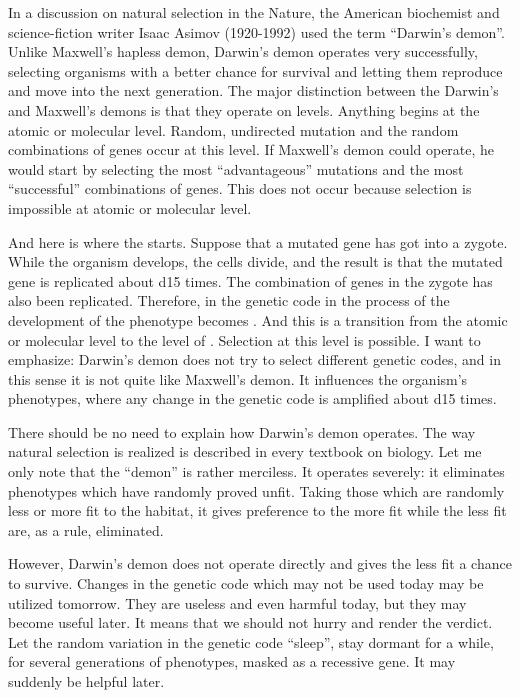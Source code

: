 In a discussion on natural selection in the Nature, the American biochemist and science-fiction writer Isaac Asimov (1920-1992) used the term ``Darwin's demon''. Unlike Maxwell's hapless demon, Darwin's demon operates very successfully, selecting organisms with a better
chance for survival and letting them reproduce and move into the next
generation. The major distinction between the Darwin's and Maxwell's
demons is that they operate on  levels. Anything begins at the atomic or molecular level. Random, undirected mutation and the
random combinations of genes occur at this level. If Maxwell's demon
could operate, he would start by selecting the most ``advantageous''
mutations and the most ``successful'' combinations of genes. This does not occur because selection is impossible at atomic or molecular level. 



And here is where the  starts. Suppose that a mutated gene has got into a zygote. While the organism develops, the cells divide, and the result is that the mutated gene is replicated about
\num{d15} times. The combination of genes in the zygote has also been replicated. Therefore,  in the genetic code in the process of the development of the phenotype becomes . And this is a transition from the atomic or molecular level to the level of . Selection at this level is possible. I want to emphasize: Darwin's demon does not try to select different genetic codes, and in this sense it is not quite like Maxwell's demon. It influences the organism's phenotypes, where any change in the genetic code is amplified about \num{d15} times.


There should be no need to explain how Darwin's demon operates. The way natural selection is realized is described in every textbook on biology. Let me only note that the ``demon'' is rather merciless. It operates severely: it eliminates phenotypes which have randomly proved unfit. Taking those which are randomly less or more fit to the habitat, it gives preference to the more fit while the less fit are, as a rule, eliminated.


However, Darwin's demon does not operate directly and gives the less fit a chance to survive. Changes in the genetic code which may not be used today may be utilized tomorrow. They are useless and even harmful today, but they may become useful later. It means that we should not hurry and render the verdict. Let the random variation in the genetic code ``sleep'', stay dormant for a while, for several generations of phenotypes, masked as a recessive gene. It may suddenly be helpful later.


